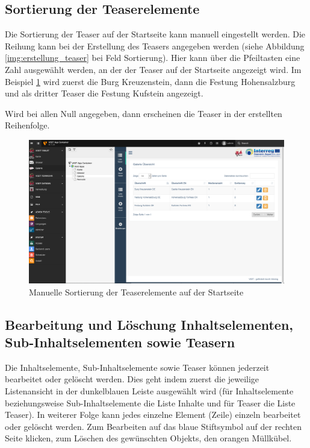 \subsection{Sortierung der Teaserelemente}

Die Sortierung der Teaser auf der Startseite kann manuell eingestellt werden. Die Reihung kann bei der Erstellung des Teasers angegeben werden (siehe Abbildung \ref{img:erstellung_teaser} bei Feld Sortierung). Hier kann über die Pfeiltasten eine Zahl ausgewählt werden, an der der Teaser auf der Startseite angezeigt wird. Im Beispiel \ref{img:sortierung_teaser} wird zuerst die Burg Kreuzenstein, dann die Festung Hohensalzburg und als dritter Teaser die Festung Kufstein angezeigt.

Wird bei allen Null angegeben, dann erscheinen die Teaser in der erstellten Reihenfolge.

\begin{figure}[ht!]
\centering
\includegraphics[width=12cm]{Figures/paula/galerie/sortierung_teaser.png}
\caption{Manuelle Sortierung der Teaserelemente auf der Startseite}
\label{img:sortierung_teaser}
\end{figure}


\subsection{Bearbeitung und Löschung Inhaltselementen, Sub-Inhaltselementen sowie Teasern}

Die Inhaltselemente, Sub-Inhaltselemente sowie Teaser können jederzeit bearbeitet oder gelöscht werden. Dies geht indem zuerst die jeweilige Listenansicht in der dunkelblauen Leiste ausgewählt wird (für Inhaltselemente beziehungsweise Sub-Inhaltselemente die Liste Inhalte und für Teaser die Liste Teaser). In weiterer Folge kann jedes einzelne Element (Zeile) einzeln bearbeitet oder gelöscht werden. Zum Bearbeiten auf das blaue Stiftsymbol auf der rechten Seite klicken, zum Löschen des gewünschten Objekts, den orangen Müllkübel.








